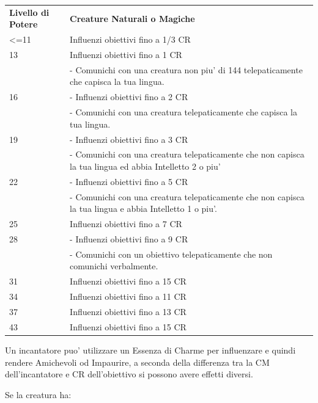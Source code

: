 \documentclass[a4paper,11pt,twoside,openany]{book}
\begin{document}
\medskip

\begin{tabular}{L{3cm} L{13cm}}
\toprule
\textbf{Livello di Potere} & \textbf{Creature Naturali o Magiche}\tabularnewline
<=11 &Influenzi obiettivi fino a 1/3 CR\\
13 & Influenzi obiettivi fino a 1 CR\\
& - Comunichi con una creatura non piu' di 144 telepaticamente che capisca la tua lingua.\\
16 & - Influenzi obiettivi fino a 2 CR\\
& - Comunichi con una creatura telepaticamente che capisca la tua lingua.\\
19 & - Influenzi obiettivi fino a 3 CR\\
& - Comunichi con una creatura telepaticamente che non capisca la tua lingua ed abbia Intelletto 2 o piu'\\
22 & - Influenzi obiettivi fino a 5 CR\\
& - Comunichi con una creatura telepaticamente che non capisca la tua lingua e abbia Intelletto 1 o piu'.\\
25 & Influenzi obiettivi fino a 7 CR \\
28 & - Influenzi obiettivi fino a 9 CR\\
& - Comunichi con un obiettivo telepaticamente che non comunichi verbalmente. \\
31 & Influenzi obiettivi fino a 15 CR\\
34 & Influenzi obiettivi fino a 11 CR\\
37 & Influenzi obiettivi fino a 13 CR\\
43 & Influenzi obiettivi fino a 15 CR\\
\end{tabular}

\medskip

Un incantatore puo' utilizzare un Essenza di Charme per influenzare e quindi rendere Amichevoli od Impaurire, a seconda della differenza tra la CM dell'incantatore e CR dell'obiettivo si possono avere effetti diversi.

\medskip

Se la creatura ha:
\end{document}
